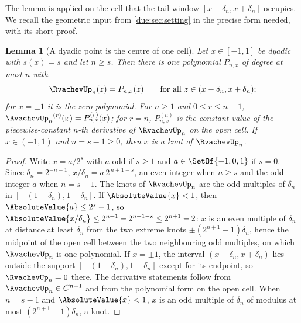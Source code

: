 \documentclass[11pt,oneside]{article}
\theoremstyle{plain}
\newtheorem{lemma}[theorem]{Lemma}
\theoremstyle{definition}
\theoremstyle{remark}
\newcommand{\upn}[1]{\RvachevUp_{#1}}
\newcommand{\dep}[1]{s\!\left(#1\right)}                    %
\begin{document}
The lemma is applied on the cell that the tail window
\([x-\delta_n,x+\delta_n]\) occupies.  We recall the geometric input from
\cref{due:sec:setting} in the precise form needed, with its short proof.

\begin{lemma}[A dyadic point is the centre of one cell]
\label{due:lem:mech-cell}
Let \(x\in[-1,1]\) be dyadic with \(\dep{x}=s\) and let \(n\ge s\).  Then
there is one polynomial \(P_{n,x}\) of degree at most \(n\) with
\begin{equation}
 \upn{n}(z)=P_{n,x}(z)\qquad\text{for all }z\in(x-\delta_n,x+\delta_n);
 \label{due:eq:mech-cell-polynomial}
\end{equation}
for \(x=\pm1\) it is the zero polynomial.  For \(n\ge1\) and \(0\le r\le n-1\),
\({\upn{n}}^{(r)}(x)=P_{n,x}^{(r)}(x)\); for \(r=n\), \(P_{n,x}^{(n)}\) is the
constant value of the piecewise-constant \(n\)-th derivative of \(\upn{n}\) on
the open cell.  If \(x\in(-1,1)\) and \(n=s-1\ge0\), then \(x\) is a knot of
\(\upn{n}\).
\end{lemma}

\begin{proof}
Write \(x=a/2^{s}\) with \(a\) odd if \(s\ge1\) and \(a\in\SetOf{-1,0,1}\)
if \(s=0\).  Since \(\delta_n=2^{-n-1}\), \(x/\delta_n=a\,2^{\,n+1-s}\), an
even integer when \(n\ge s\) and the odd integer \(a\) when \(n=s-1\).  The
knots of \(\upn{n}\) are the odd multiples of \(\delta_n\) in
\([-(1-\delta_n),1-\delta_n]\).  If \(\AbsoluteValue{x}<1\), then
\(\AbsoluteValue{a}\le2^{s}-1\), so
\(\AbsoluteValue{x/\delta_n}\le2^{n+1}-2^{n+1-s}\le2^{n+1}-2\): \(x\) is an
even multiple of \(\delta_n\) at distance at least \(\delta_n\) from the two
extreme knots \(\pm(2^{n+1}-1)\delta_n\), hence the midpoint of the open cell
between the two neighbouring odd multiples, on which \(\upn{n}\) is one
polynomial.  If \(x=\pm1\), the interval \((x-\delta_n,x+\delta_n)\) lies
outside the support \([-(1-\delta_n),1-\delta_n]\) except for its endpoint,
so \(\upn{n}=0\) there.  The derivative statements follow from
\(\upn{n}\in C^{n-1}\) and from the polynomial form on the open cell.  When
\(n=s-1\) and \(\AbsoluteValue{x}<1\), \(x\) is an odd multiple of
\(\delta_n\) of modulus at most \((2^{n+1}-1)\delta_n\), a knot.
\end{proof}
\end{document}
